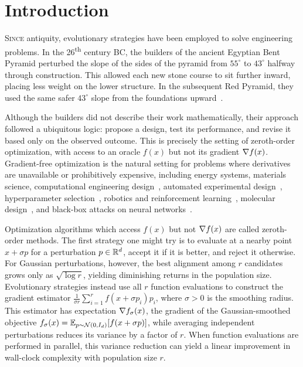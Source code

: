 \chapter[Introduction]{Introduction}
\label{chap:introduction}

\lettrine[
  lines=4,
]{\color{OxfordBlue} S}
{ince} antiquity, evolutionary strategies have been employed to solve engineering problems. In the 26\textsuperscript{th} century BC, the builders of the ancient Egyptian Bent Pyramid perturbed the slope of the sides of the pyramid from $55^\circ$ to $43^\circ$ halfway through construction. This allowed each new stone course to sit further inward, placing less weight on the lower structure. In the subsequent Red Pyramid, they used the same safer $43^\circ$ slope from the foundations upward~\citep{lehner1997pyramids}.

Although the builders did not describe their work mathematically, their approach followed a ubiquitous logic: propose a design, test its performance, and revise it based only on the observed outcome. This is precisely the setting of zeroth-order optimization, with access to an oracle $f(x)$ but not its gradient $\nabla f(x)$. Gradient-free optimization is the natural setting for problems where derivatives are unavailable or prohibitively expensive, including energy systems, materials science, computational engineering design~\citep{alarie2021blackbox}, automated experimental design~\citep{shahriari2016human}, hyperparameter selection~\citep{bergstra2012random}, robotics and reinforcement learning~\citep{cully2015robots,salimans2017evolution}, molecular design~\citep{gomez2018automatic}, and black-box attacks on neural networks~\citep{chen2017zoo}.

Optimization algorithms which access $f(x)$ but not $\nabla f(x)$ are called zeroth-order methods. The first strategy one might try is to evaluate at a nearby point $x+\sigma p$ for a perturbation $p \in \mathbb{R}^d$, accept it if it is better, and reject it otherwise. For Gaussian perturbations, however, the best alignment among $r$ candidates grows only as $\sqrt{\log r}$, yielding diminishing returns in the population size. Evolutionary strategies instead use all $r$ function evaluations to construct the gradient estimator $\frac{1}{\sigma r} \sum_{i=1}^r f(x+\sigma p_i) p_i$, where $\sigma > 0$ is the smoothing radius. This estimator has expectation $\nabla f_\sigma(x)$, the gradient of the Gaussian-smoothed objective $f_\sigma(x) = \mathbb{E}_{p \sim \mathcal N(0,I_d)}[f(x+\sigma p)]$, while averaging independent perturbations reduces its variance by a factor of $r$. When function evaluations are performed in parallel, this variance reduction can yield a linear improvement in wall-clock complexity with population size $r$.

